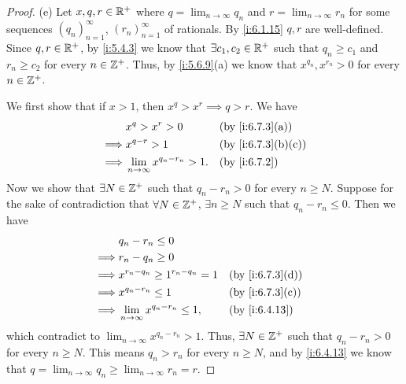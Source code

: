 \begin{proof}{(e)}
  Let \(x, q, r \in \mathbb{R}^+\) where \(q = \lim_{n \to \infty} q_n\) and \(r = \lim_{n \to \infty} r_n\) for some sequences \((q_n)_{n = 1}^\infty\), \((r_n)_{n = 1}^\infty\) of rationals.
  By \cref{i:6.1.15} \(q, r\) are well-defined.
  Since \(q, r \in \mathbb{R}^+\), by \cref{i:5.4.3} we know that \(\exists c_1, c_2 \in \mathbb{R}^+\) such that \(q_n \geq c_1\) and \(r_n \geq c_2\) for every \(n \in \mathbb{Z}^+\).
  Thus, by \cref{i:5.6.9}(a) we know that \(x^{q_n}, x^{r_n} > 0\) for every \(n \in \mathbb{Z}^+\).

  We first show that if \(x > 1\), then \(x^q > x^r \implies q > r\).
  We have
  \begin{align*}
             & x^q > x^r > 0                          &  & \by{i:6.7.3}[a]   \\
    \implies & x^{q - r} > 1                          &  & \by{i:6.7.3}[b,c] \\
    \implies & \lim_{n \to \infty} x^{q_n - r_n} > 1. &  & \by{i:6.7.2}      \\
  \end{align*}
  Now we show that \(\exists N \in \mathbb{Z}^+\) such that \(q_n - r_n > 0\) for every \(n \geq N\).
  Suppose for the sake of contradiction that \(\forall N \in \mathbb{Z}^+\), \(\exists n \geq N\) such that \(q_n - r_n \leq 0\).
  Then we have
  \begin{align*}
             & q_n - r_n \leq 0                                               \\
    \implies & r_n - q_n \geq 0                                               \\
    \implies & x^{r_n - q_n} \geq 1^{r_n - q_n} = 1      &  & \by{i:6.7.3}[d] \\
    \implies & x^{q_n - r_n} \leq 1                      &  & \by{i:6.7.3}[c] \\
    \implies & \lim_{n \to \infty} x^{q_n - r_n} \leq 1, &  & \by{i:6.4.13}
  \end{align*}
  which contradict to \(\lim_{n \to \infty} x^{q_n - r_n} > 1\).
  Thus, \(\exists N \in \mathbb{Z}^+\) such that \(q_n - r_n > 0\) for every \(n \geq N\).
  This means \(q_n > r_n\) for every \(n \geq N\), and by \cref{i:6.4.13} we know that \(q = \lim_{n \to \infty} q_n \geq \lim_{n \to \infty} r_n = r\).


\end{proof}

